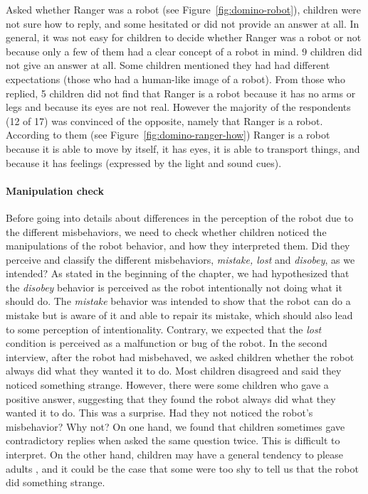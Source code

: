 \documentclass{sig-alternate}
\begin{document}
Asked whether Ranger was a robot (see Figure~\ref{fig:domino-robot}), children
were not sure how to reply, and some hesitated or did not provide an answer at
all. In general, it was not easy for children to decide whether Ranger was a
robot or not because only a few of them had a clear concept of a robot in mind.
9 children did not give an answer at all. Some children mentioned they had had
different expectations (those who had a human-like image of a robot). From those
who replied, 5 children did not find that Ranger is a robot because it has no
arms or legs and because its eyes are not real. However the majority of the
respondents (12 of 17) was convinced of the opposite, namely that Ranger is a
robot. According to them (see Figure~\ref{fig:domino-ranger-how}) Ranger is a
robot because it is able to move by itself, it has eyes, it is able to transport
things, and because it has feelings (expressed by the light and sound cues).

\paragraph{Manipulation check} 

Before going into details about differences in the perception of the robot due
to the different misbehaviors, we need to check whether children noticed the
manipulations of the robot behavior, and how they interpreted them. Did they
perceive and classify the different misbehaviors, \textit{mistake, lost} and
\textit{disobey}, as we intended?  As stated in the beginning of the chapter, we
had hypothesized that the \textit{disobey} behavior is perceived as the robot
intentionally not doing what it should do. The \textit{mistake} behavior was
intended to show that the robot can do a mistake but is aware of it and able to
repair its mistake, which should also lead to some perception of intentionality.
Contrary, we expected that the \textit{lost} condition is perceived as a
malfunction or bug of the robot.  In the second interview, after the robot had
misbehaved, we asked children whether the robot always did what they wanted it
to do. Most children disagreed and said they noticed something strange. However,
there were some children who gave a positive answer, suggesting that they found
the robot always did what they wanted it to do. This was a surprise. Had they
not noticed the robot's misbehavior? Why not? On one hand, we found that
children sometimes gave contradictory replies when asked the same question
twice. This is difficult to interpret. On the other hand, children may have a
general tendency to please adults \cite{leite_long-term_2013}, and it could be
the case that some were too shy to tell us that the robot did something strange.
\end{document}
